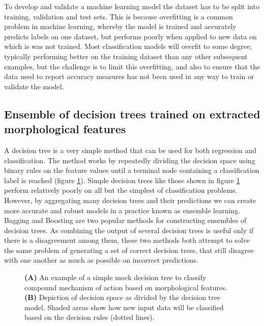 \documentclass[a4paper,11pt,twoside,openright]{scrbook}
\begin{document}
To develop and validate a machine learning model the dataset has to be split into training, validation and test sets.
This is because overfitting is a common problem in machine learning, whereby the model is trained and accurately predicts labels on one dataset, but performs poorly when applied to new data on which is was not trained.
Most classification models will overfit to some degree, typically performing better on the training dataset than any other subsequent examples, but the challenge is to limit this overfitting, and also to ensure that the data used to report accuracy measures has not been used in any way to train or validate the model.




\subsection{Ensemble of decision trees trained on extracted morphological features}
A decision tree is a very simple method that can be used for both regression and classification.
The method works by repeatedly dividing the decision space using binary rules on the feature values until a terminal node containing a classification label is reached (figure \ref{figure:decision_tree}).
Simple decision trees like those shown in figure \ref{figure:decision_tree} perform relatively poorly on all but the simplest of classification problems.
However, by aggregating many decision trees and their predictions we can create more accurate and robust models in a practice known as ensemble learning. \cite{Opitz1999}
Bagging \cite{Breiman1996} and Boosting \cite{Freund1996} are two popular methods for constructing ensembles of decision trees.
As combining the output of several decision trees is useful only if there is a disagreement among them, these two methods both attempt to solve the same problem of generating a set of correct decision tress, that still disagree with one another as much as possible on incorrect predictions.


\begin{figure}
    \captionsetup{width=0.8\textwidth}
    \caption[Diagram of a simple decision tree]{\textbf{(A)} An example of a simple mock decision tree to classify compound mechanism of action based on morphological features. \textbf{(B)} Depiction of decision space as divided by the decision tree model. Shaded areas show how new input data will be classified based on the decision rules (dotted lines).}
    
    \label{figure:decision_tree}
\end{figure}
\end{document}
